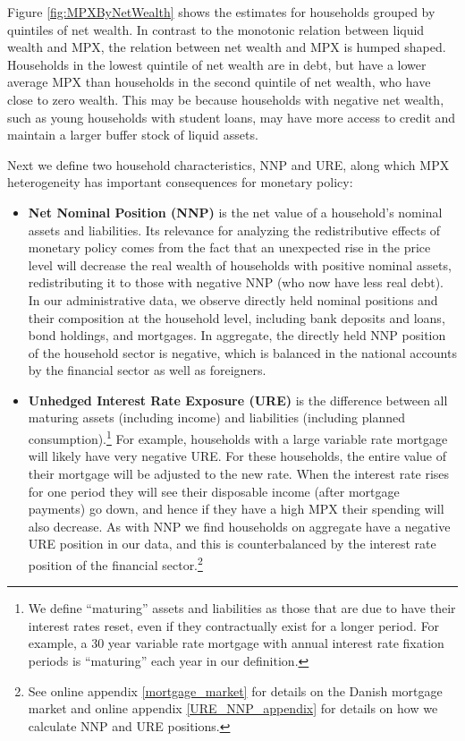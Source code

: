\documentclass[titlepage]{\econtex}\newcommand{\texname}{ConsumptionHeterogeneity}
\begin{document}
	Figure \ref{fig:MPXByNetWealth} shows the estimates for households grouped by quintiles of net wealth. In contrast to the monotonic relation between liquid wealth and MPX, the relation between net wealth and MPX is humped shaped. Households in the lowest quintile of net wealth are in debt, but have a lower average MPX than households in the second quintile of net wealth, who have close to zero wealth. This may be because households with negative net wealth, such as young households with student loans, may have more access to credit and maintain a larger buffer stock of liquid assets.
	
	Next we define two household characteristics, NNP and URE, along which MPX heterogeneity has important consequences for monetary policy:
	\begin{itemize}
		\item \textbf{Net Nominal Position (NNP)} is the net value of a household's nominal assets and liabilities. Its relevance for analyzing the redistributive effects of monetary policy comes from the fact that an unexpected rise in the price level will decrease the real wealth of households with positive nominal assets, redistributing it to those with negative NNP (who now have less real debt). In our administrative data, we observe directly held nominal positions and their composition at the household level, including bank deposits and loans, bond holdings, and mortgages. In aggregate, the directly held NNP position of the household sector is negative, which is balanced in the national accounts by the financial sector as well as foreigners.
		\item \textbf{Unhedged Interest Rate Exposure (URE)} is the difference between all maturing assets (including income) and liabilities (including planned consumption).\footnote{We define ``maturing'' assets and liabilities as those that are due to have their interest rates reset, even if they contractually exist for a longer period. For example, a 30 year variable rate mortgage with annual interest rate fixation periods is ``maturing'' each year in our definition.} For example, households with a large variable rate mortgage will likely have very negative URE. For these households, the entire value of their mortgage will be adjusted to the new rate. When the interest rate rises for one period they will see their disposable income (after mortgage payments) go down, and hence if they have a high MPX their spending will also decrease. As with NNP we find households on aggregate have a negative URE position in our data, and this is counterbalanced by the interest rate position of the financial sector.\footnote{See online appendix \ref{mortgage_market} for details on the Danish mortgage market and online appendix \ref{URE_NNP_appendix} for details on how we calculate NNP and URE positions.}
	\end{itemize}
\end{document}
